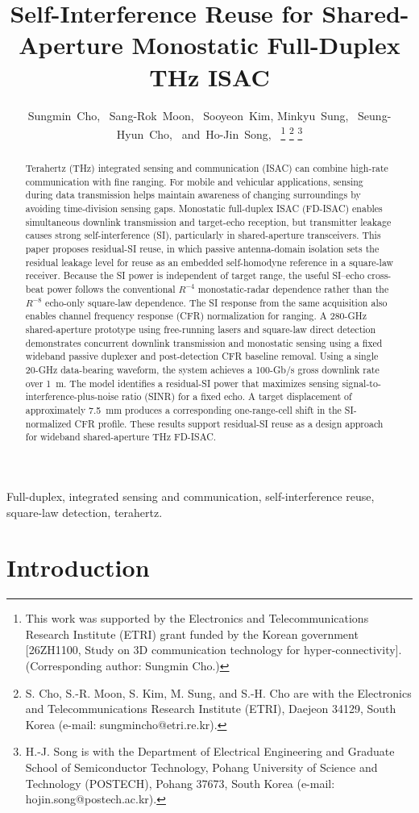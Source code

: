\documentclass[10pt,journal]{IEEEtran}
\title{Self-Interference Reuse for Shared-Aperture Monostatic Full-Duplex THz ISAC}
\author{Sungmin~Cho,~\IEEEmembership{Member,~IEEE,}
        Sang-Rok~Moon,~\IEEEmembership{Member,~IEEE,}
        Sooyeon~Kim,
        Minkyu~Sung,~\IEEEmembership{Member,~IEEE,}
        Seung-Hyun~Cho,~\IEEEmembership{Member,~IEEE,}
        and~Ho-Jin~Song,~\IEEEmembership{Fellow,~IEEE}%
\thanks{This work was supported by the Electronics and Telecommunications
Research Institute (ETRI) grant funded by the Korean government
[26ZH1100, Study on 3D communication technology for hyper-connectivity].
(Corresponding author: Sungmin Cho.)}%
\thanks{S. Cho, S.-R. Moon, S. Kim, M. Sung, and S.-H. Cho are with the Electronics
and Telecommunications Research Institute (ETRI), Daejeon 34129, South
Korea (e-mail: sungmincho@etri.re.kr).}%
\thanks{H.-J. Song is with the Department of Electrical Engineering and
Graduate School of Semiconductor Technology, Pohang University of Science
and Technology (POSTECH), Pohang 37673, South Korea
(e-mail: hojin.song@postech.ac.kr).}%
}
\DeclareRobustCommand{\rev}[1]{\textcolor{revisioncolor}{#1}}
\begin{document}
\maketitle
\begin{abstract}
Terahertz (THz) integrated sensing and communication (ISAC) can
combine high-rate communication with fine ranging. For mobile and vehicular applications, sensing during data transmission helps maintain awareness of changing surroundings by avoiding time-division sensing gaps. Monostatic full-duplex ISAC (FD-ISAC) enables simultaneous downlink
transmission and target-echo reception, but transmitter leakage
causes strong self-interference (SI), particularly in shared-aperture
transceivers. This paper proposes residual-SI reuse, in which passive
\rev{antenna-domain isolation sets the residual leakage level for reuse
as an embedded self-homodyne reference in a square-law receiver.} Because the SI power is independent of target
range, the useful SI--echo cross-beat power follows the conventional
$R^{-4}$ monostatic-radar dependence rather than the $R^{-8}$
echo-only square-law dependence. The SI response from the same
acquisition also enables channel frequency response (CFR)
normalization for ranging. A 280-GHz shared-aperture prototype using
free-running lasers and square-law direct detection \rev{demonstrates concurrent downlink transmission and monostatic
sensing using a fixed wideband passive duplexer and post-detection
CFR baseline removal.} Using a single 20-GHz data-bearing waveform, the system
achieves a 100-Gb/s gross downlink rate over 1~m. \rev{The model identifies a residual-SI power that maximizes sensing
signal-to-interference-plus-noise ratio (SINR) for a fixed echo.
A target displacement of approximately 7.5~mm produces a
corresponding one-range-cell shift in the SI-normalized CFR profile.}
These results support residual-SI reuse as a design approach for
wideband shared-aperture THz FD-ISAC.
\end{abstract}
\begin{IEEEkeywords}
Full-duplex, integrated sensing and communication,
self-interference reuse, square-law detection, terahertz.
\end{IEEEkeywords}

\section{Introduction}
\end{document}
